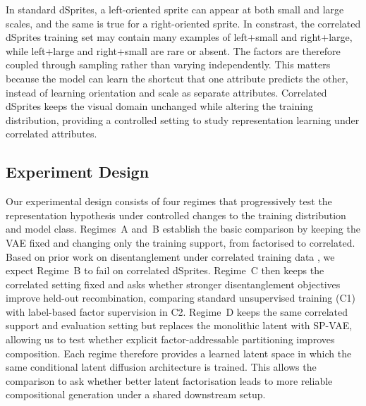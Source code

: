 In standard dSprites, a left-oriented sprite can appear at both small and large scales, and the same is true for a right-oriented sprite.
In constrast, the correlated dSprites training set may contain many examples of left+small and right+large, while left+large and right+small are rare or absent. 
The factors are therefore coupled through sampling rather than varying independently. 
This matters because the model can learn the shortcut that one attribute predicts the other, instead of learning orientation and scale as separate attributes. 
Correlated dSprites keeps the visual domain unchanged while altering the training distribution, providing a controlled setting to study representation learning under correlated attributes.

\subsection{Experiment Design}
\label{subsec:p2_models}

Our experimental design consists of four regimes that progressively test the representation hypothesis under controlled changes to the training distribution and model class. 
Regimes~A and~B establish the basic comparison by keeping the VAE fixed and changing only the training support, from factorised to correlated.
Based on prior work on disentanglement under correlated training data \citep{traeuble2021disentangled, funke2022disentanglement,roth2023disentanglement}, we expect Regime~B to fail on correlated dSprites. 
Regime~C then keeps the correlated setting fixed and asks whether stronger disentanglement objectives improve held-out recombination, comparing standard unsupervised training (C1) with label-based factor supervision in C2. 
Regime~D keeps the same correlated support and evaluation setting but replaces the monolithic latent with SP-VAE, allowing us to test whether explicit factor-addressable partitioning improves composition.
Each regime therefore provides a learned latent space in which the same conditional latent diffusion
architecture is trained. This allows the comparison to ask whether better latent factorisation leads
to more reliable compositional generation under a shared downstream setup.

